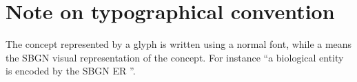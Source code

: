 
\section{Note on typographical convention}

The concept represented by a glyph is written using a normal font, while a  means the SBGN visual representation of the concept. For instance ``a biological entity is encoded by the SBGN ER ''. 
